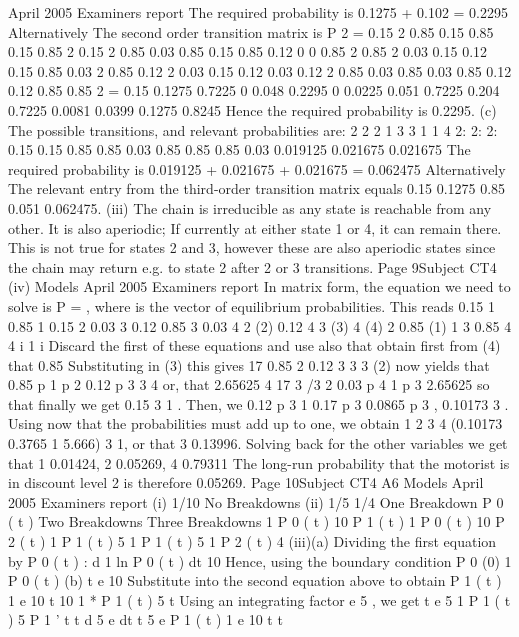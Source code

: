 \documentclass[a4paper,12pt]{article}
\begin{document}
\begin{enumerate}
April 2005
Examiners report
The required probability is 0.1275 + 0.102 = 0.2295
Alternatively
The second order transition matrix is
P 2 =
0.15 2 0.85 0.15 0.85 0.15
0.85 2
0.15 2 0.85 0.03 0.85 0.15 0.85 0.12 0
0
0.85 2
0.85 2
0.03 0.15 0.12 0.15 0.85 0.03 2 0.85 0.12 2
0.03 0.15 0.12 0.03 0.12 2 0.85 0.03 0.85 0.03 0.85 0.12 0.12 0.85 0.85 2
=
0.15 0.1275 0.7225 0
0.048 0.2295 0
0.0225 0.051
0.7225
0.204
0.7225
0.0081 0.0399 0.1275 0.8245
Hence the required probability is 0.2295.
(c)
The possible transitions, and relevant probabilities are:
2
2
2
1
3
3
1
1
4
2:
2:
2:
0.15 0.15 0.85
0.85 0.03 0.85
0.85 0.85 0.03
0.019125
0.021675
0.021675
The required probability is
0.019125 + 0.021675 + 0.021675 = 0.062475
Alternatively
The relevant entry from the third-order transition matrix equals
0.15 0.1275 0.85 0.051 0.062475.
(iii)
The chain is irreducible as
any state is reachable from any other.
It is also aperiodic;
If currently at either state 1 or 4, it can remain there. This is not true for states
2 and 3, however these are also aperiodic states since the chain may return e.g.
to state 2 after 2 or 3 transitions.
Page 9Subject CT4
(iv)
Models
April 2005
Examiners report
In matrix form, the equation we need to solve is P = ,
where is the vector of equilibrium probabilities.
This reads
0.15 1
0.85 1
0.15
2
0.03
3
0.12
0.85
3
0.03 4 2 (2)
0.12 4 3 (3)
4 (4)
2
0.85
(1)
1
3
0.85
4
4
i 1 i
Discard the first of these equations and use also that
obtain first from (4) that 0.85
Substituting in (3) this gives
17
0.85 2 0.12
3
3
3
(2) now yields that
0.85 p 1 p 2 0.12 p 3
3
4
or, that
2.65625
4
17
3 /3
2
0.03 p 4
1
p 3
2.65625
so that finally we get
0.15
3
1 . Then, we
0.12 p 3
1
0.17 p 3
0.0865 p 3 ,
0.10173 3 .
Using now that the probabilities must add up to one, we obtain
1
2
3
4 (0.10173 0.3765 1 5.666) 3 1,
or that
3
0.13996.
Solving back for the other variables we get that
1 0.01424,
2 0.05269,
4 0.79311
The long-run probability that the motorist is in discount level 2 is therefore
0.05269.
Page 10Subject CT4
A6
Models
April 2005
Examiners report
(i)
1/10
No
Breakdowns
(ii)
1/5
1/4
One
Breakdown
P 0 ( t )
Two
Breakdowns
Three
Breakdowns
1
P 0 ( t )
10
P 1 ( t ) 1
P 0 ( t )
10
P 2 ( t ) 1
P 1 ( t )
5
1
P 1 ( t )
5
1
P 2 ( t )
4
(iii)(a) Dividing the first equation by P 0 ( t ) :
d
1
ln P 0 ( t )
dt
10
Hence, using the boundary condition P 0 (0) 1
P 0 ( t )
(b)
t
e 10
Substitute into the second equation above to obtain
P 1 ( t )
1
e
10
t
10
1
* P 1 ( t )
5
t
Using an integrating factor e 5 , we get
t
e 5
1
P 1 ( t )
5
P 1 ' t
t
d 5
e
dt
t
5
e
P 1 ( t )
1
e
10
t t

\end{enumerate}
\end{document}
